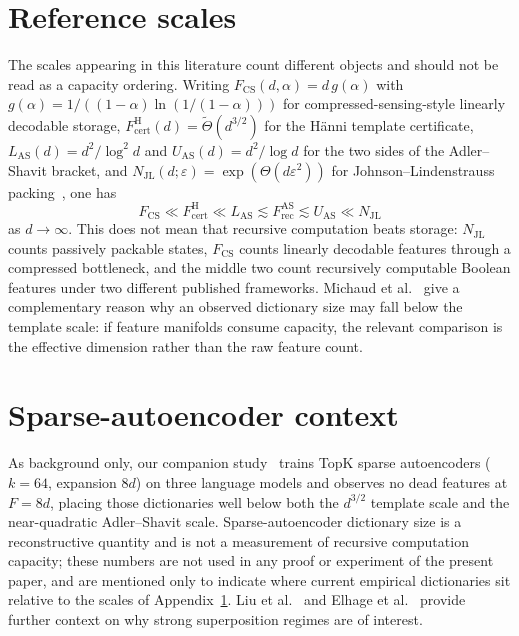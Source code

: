 \documentclass[preprint,12pt]{elsarticle}
\theoremstyle{definition}
\newcommand{\Thetatilde}{\widetilde{\Theta}}
\newcommand{\FrecAS}{F_{\mathrm{rec}}^{\mathrm{AS}}}
\begin{document}
\section{Reference scales}
\label{app:scales}

The scales appearing in this literature count different objects and should not be read as a
capacity ordering. Writing $F_{\mathrm{CS}}(d,\alpha)=d\,g(\alpha)$ with
$g(\alpha)=1/((1-\alpha)\ln(1/(1-\alpha)))$ for compressed-sensing-style linearly decodable
storage, $F^{\mathrm{H}}_{\mathrm{cert}}(d)=\Thetatilde(d^{3/2})$ for the H\"{a}nni template
certificate, $L_{\mathrm{AS}}(d)=d^2/\log^2 d$ and $U_{\mathrm{AS}}(d)=d^2/\log d$ for the two
sides of the Adler--Shavit bracket, and $N_{\mathrm{JL}}(d;\varepsilon)=\exp(\Theta(d
\varepsilon^2))$ for Johnson--Lindenstrauss packing~\cite{JL1984}, one has
\[
  F_{\mathrm{CS}}\ll F^{\mathrm{H}}_{\mathrm{cert}}\ll L_{\mathrm{AS}}
  \lesssim\FrecAS\lesssim U_{\mathrm{AS}}\ll N_{\mathrm{JL}}
\]
as $d\to\infty$. This does not mean that recursive computation beats storage:
$N_{\mathrm{JL}}$ counts passively packable states, $F_{\mathrm{CS}}$ counts linearly decodable
features through a compressed bottleneck, and the middle two count recursively computable
Boolean features under two different published frameworks. Michaud et
al.~\cite{michaud2025manifolds} give a complementary reason why an observed dictionary size may
fall below the template scale: if feature manifolds consume capacity, the relevant comparison
is the effective dimension rather than the raw feature count.

\section{Sparse-autoencoder context}
\label{app:sae}

As background only, our companion study~\cite{borobia2026pruning} trains TopK sparse
autoencoders ($k=64$, expansion $8d$) on three language models and observes no dead features at
$F=8d$, placing those dictionaries well below both the $d^{3/2}$ template scale and the
near-quadratic Adler--Shavit scale. Sparse-autoencoder dictionary size is a reconstructive
quantity and is not a measurement of recursive computation capacity; these numbers are not used
in any proof or experiment of the present paper, and are mentioned only to indicate where
current empirical dictionaries sit relative to the scales of Appendix~\ref{app:scales}.
Liu et al.~\cite{liu2025scaling} and Elhage et al.~\cite{elhage2022superposition} provide
further context on why strong superposition regimes are of interest.
\end{document}
